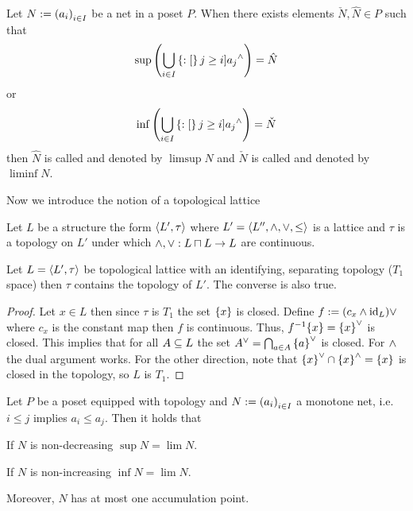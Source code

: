 \documentclass[8pt,a4paper]{article}
\begin{document}
\begin{definition}
    Let $N:=\net[i\in I]{a_i}$ be a net in a poset $P$. When there exists elements $\check{N},\hat{N}\in P$ such that
    $$
    \sup{\left(\Setjoin_{i\in I}{\set[j \geq i]{a_j}^{\meet}}\right)}=\hat{N}
    $$
    or
    $$
    \inf{\left(\Setjoin_{i\in I}{\set[j \geq i]{a_j}^{\meet}}\right)}=\check{N}
    $$
    then $\hat{N}$ is called  and denoted by $\limsup{N}$ and $\check{N}$ is called  and denoted by $\liminf{N}$.
\end{definition}

Now we introduce the notion of a topological lattice

\begin{definition}
    Let $L$ be a structure the form $\struct{L',\tau}$ where $L'=\struct{L'',\meet,\join,\leq}$ is a lattice and $\tau$ is a topology on $L'$ under which $\wedge, \vee:L\mathbin{\sqcap} L \rightarrow L$ are continuous.
\end{definition}

\begin{lemma}
    Let $L=\struct{L',\tau}$ be topological lattice with an identifying, separating topology ($T_1$ space) then $\tau$ contains the  topology of $L'$. The converse is also true.
\end{lemma}

\begin{proof}
    Let $x\in L$ then since $\tau$ is $T_1$ the set $\set{x}$ is closed. Define $f:=(c_x\wedge\mathop\mathrm{id}\nolimits_L)\vee$ where $c_x$ is the constant map then $f$ is continuous. Thus, $f^{-1}{\set{x}}=\set{x}^{\join}$ is closed. This implies that for all $A\subseteq L$ the set $A^{\join}=\Setmeet_{a\in A}{\set{a}^{\join}}$ is closed. For $\wedge$ the dual argument works.
    For the other direction, note that $\set{x}^\join\setmeet\set{x}^{\meet}=\set{x}$ is closed in the  topology, so $L$ is $T_1$.
\end{proof}

\begin{lemma}
    Let $P$ be a poset equipped with  topology and $N:=\net[i\in I]{a_i}$ a monotone net, i.e. $i\leq j$ implies $a_i\leq a_j$. Then it holds that
    \begin{statements}
            \item If $N$ is non-decreasing $\sup{N}=\lim{N}$.
            \item If $N$ is non-increasing $\inf{N}=\lim{N}$.
    \end{statements}
    Moreover, $N$ has at most one accumulation point.
\end{lemma}
\end{document}
